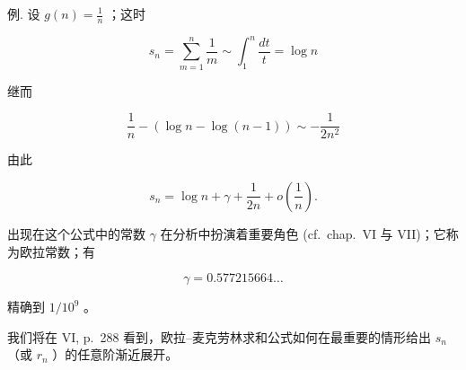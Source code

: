 例. 设 \(g(n) = \frac{1}{n}\) ；这时

\[
s _ {n} = \sum_ {m = 1} ^ {n} \frac {1}{m} \sim \int_ {1} ^ {n} \frac {d t}{t} = \log n
\]

继而

\[
\frac {1}{n} - (\log n - \log (n - 1)) \sim - \frac {1}{2 n ^ {2}}
\]

由此

\[
s _ {n} = \log n + \gamma + \frac {1}{2 n} + o \left(\frac {1}{n}\right).
\]

出现在这个公式中的常数 \(\gamma\) 在分析中扮演着重要角色 (cf.~chap.~VI 与 VII)；它称为欧拉常数；有

\[
\gamma = 0. 5 7 7   2 1 5   6 6 4 \dots
\]

精确到 \(1/10^{9}\) 。

我们将在 VI, p.~288 看到，欧拉–麦克劳林求和公式如何在最重要的情形给出 \(s_n\) （或 \(r_n\) ）的任意阶渐近展开。

